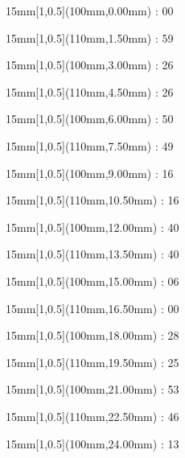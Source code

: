 \documentclass[a4paper]{memoir}
\begin{document}
\begin{textblock*}{15mm}[1,0.5](100mm,0.00mm) : 00\end{textblock*}
\begin{textblock*}{15mm}[1,0.5](110mm,1.50mm) : 59\end{textblock*}
\begin{textblock*}{15mm}[1,0.5](100mm,3.00mm) : 26\end{textblock*}
\begin{textblock*}{15mm}[1,0.5](110mm,4.50mm) : 26\end{textblock*}
\begin{textblock*}{15mm}[1,0.5](100mm,6.00mm) : 50\end{textblock*}
\begin{textblock*}{15mm}[1,0.5](110mm,7.50mm) : 49\end{textblock*}
\begin{textblock*}{15mm}[1,0.5](100mm,9.00mm) : 16\end{textblock*}
\begin{textblock*}{15mm}[1,0.5](110mm,10.50mm) : 16\end{textblock*}
\begin{textblock*}{15mm}[1,0.5](100mm,12.00mm) : 40\end{textblock*}
\begin{textblock*}{15mm}[1,0.5](110mm,13.50mm) : 40\end{textblock*}
\begin{textblock*}{15mm}[1,0.5](100mm,15.00mm) : 06\end{textblock*}
\begin{textblock*}{15mm}[1,0.5](110mm,16.50mm) : 00\end{textblock*}
\begin{textblock*}{15mm}[1,0.5](100mm,18.00mm) : 28\end{textblock*}
\begin{textblock*}{15mm}[1,0.5](110mm,19.50mm) : 25\end{textblock*}
\begin{textblock*}{15mm}[1,0.5](100mm,21.00mm) : 53\end{textblock*}
\begin{textblock*}{15mm}[1,0.5](110mm,22.50mm) : 46\end{textblock*}
\begin{textblock*}{15mm}[1,0.5](100mm,24.00mm) : 13\end{textblock*}
\end{document}
